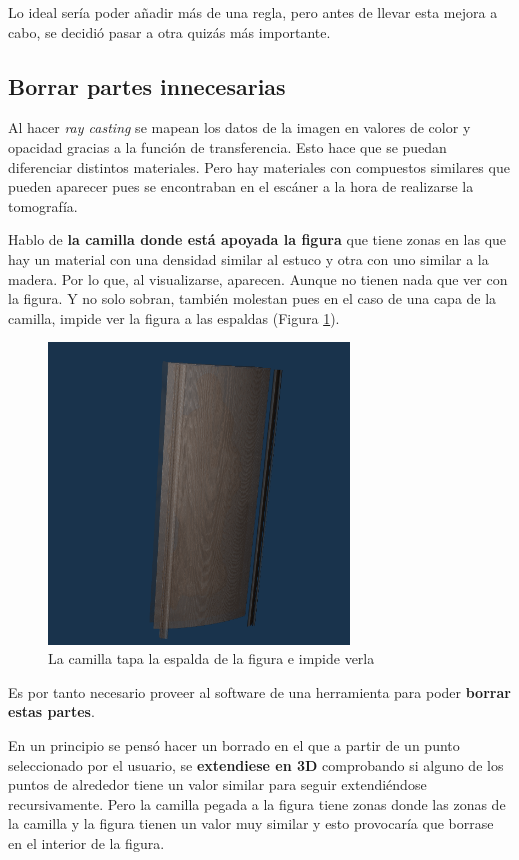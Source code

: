 Lo ideal sería poder añadir más de una regla, pero antes de llevar esta mejora a cabo, se decidió pasar a otra quizás más importante.

\subsection{Borrar partes innecesarias}

Al hacer \textit{ray casting} se mapean los datos de la imagen en valores de color y opacidad gracias a la función de transferencia. Esto hace que se puedan diferenciar distintos materiales. Pero hay materiales con compuestos similares que pueden aparecer pues se encontraban en el escáner a la hora de realizarse la tomografía.

Hablo de \textbf{la camilla donde está apoyada la figura} que tiene zonas en las que hay un material con una densidad similar al estuco y otra con uno similar a la madera. Por lo que, al visualizarse, aparecen. Aunque no tienen nada que ver con la figura. Y no solo sobran, también molestan pues en el caso de una capa de la camilla, impide ver la figura a las espaldas (Figura \ref{fig:necesario_borrar}).

\begin{figure}[H]
	\centering
	\includegraphics[width=8cm]{imagenes/necesario_borrar}
	\caption{La camilla tapa la espalda de la figura e impide verla}
	\label{fig:necesario_borrar}
\end{figure}

Es por tanto necesario proveer al software de una herramienta para poder \textbf{borrar estas partes}.

En un principio se pensó hacer un borrado en el que a partir de un punto seleccionado por el usuario, se \textbf{extendiese en 3D} comprobando si alguno de los puntos de alrededor tiene un valor similar para seguir extendiéndose recursivamente. Pero la camilla pegada a la figura tiene zonas donde las zonas de la camilla y la figura tienen un valor muy similar y esto provocaría que borrase en el interior de la figura.


